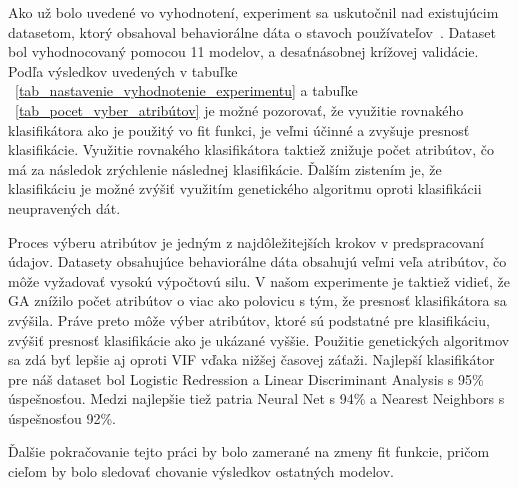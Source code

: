 \documentclass[runningheads]{llncs}
\begin{document}
Ako už bolo uvedené vo vyhodnotení, experiment sa uskutočnil nad existujúcim datasetom, 
ktorý obsahoval behaviorálne dáta o stavoch používateľov~\cite{ref_dataset_anguita,ref_dataset}.
Dataset bol vyhodnocovaný pomocou 11 modelov, a desaťnásobnej krížovej validácie.
Podľa výsledkov uvedených v tabuľke ~\ref{tab_nastavenie_vyhodnotenie_experimentu} 
a tabuľke ~\ref{tab_pocet_vyber_atribútov} je možné pozorovať, že využitie rovnakého klasifikátora
ako je použitý vo fit funkci, je veľmi účinné a zvyšuje presnosť klasifikácie. Využitie rovnakého klasifikátora taktiež znižuje počet atribútov,
čo má za následok zrýchlenie následnej klasifikácie. Ďalším zistením je, že klasifikáciu je možné zvýšiť 
využitím genetického algoritmu oproti klasifikácii neupravených dát. 

Proces výberu atribútov je jedným z najdôležitejších krokov v predspracovaní údajov. Datasety 
obsahujúce behaviorálne dáta obsahujú veľmi veľa atribútov, čo môže vyžadovať vysokú výpočtovú silu. V našom
experimente je taktiež vidieť, že GA znížilo počet atribútov o viac ako polovicu s tým, že presnosť klasifikátora sa zvýšila.
Práve preto môže výber atribútov, ktoré sú podstatné pre klasifikáciu, zvýšiť presnosť klasifikácie
ako je ukázané vyššie. Použitie genetických algoritmov sa zdá byť lepšie aj oproti VIF vďaka nižšej časovej záťaži.
Najlepší klasifikátor pre náš dataset bol Logistic Redression a Linear Discriminant Analysis s 95\% úspešnosťou. Medzi najlepšie tiež patria
Neural Net s 94\% a Nearest Neighbors s úspešnosťou 92\%.

Ďalšie pokračovanie tejto práci by bolo zamerané na zmeny fit funkcie, pričom cieľom by bolo sledovať chovanie výsledkov ostatných modelov.
\end{document}
